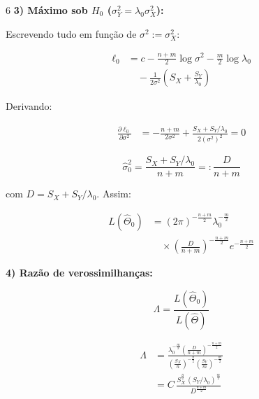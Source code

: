 \documentclass[8pt, a4paper, landscape]{extarticle}
\begin{document}
\begin{multicols}{6}
\textbf{3) Máximo sob $H_0$ ($\sigma_Y^2 = \lambda_0\sigma_X^2$):}

Escrevendo tudo em função de $\sigma^2 := \sigma_X^2$:

\begin{equation*}
\begin{split}
\ell_0 &= c - \frac{n+m}{2}\log\sigma^2 - \frac{m}{2}\log\lambda_0 \\
&\quad - \frac{1}{2\sigma^2}\left(S_X + \frac{S_Y}{\lambda_0}\right)
\end{split}
\end{equation*}

Derivando:

\begin{equation*}
\begin{split}
\frac{\partial\ell_0}{\partial\sigma^2} &= -\frac{n+m}{2\sigma^2} + \frac{S_X + S_Y/\lambda_0}{2(\sigma^2)^2} = 0
\end{split}
\end{equation*}

\begin{equation*}
\hat{\sigma}_0^2 = \frac{S_X + S_Y/\lambda_0}{n+m} =: \frac{D}{n+m}
\end{equation*}

com $D = S_X + S_Y/\lambda_0$. Assim:

\begin{equation*}
\begin{split}
L(\hat{\Theta}_0) &= (2\pi)^{-\frac{n+m}{2}}\lambda_0^{-\frac{m}{2}} \\
&\quad \times \left(\frac{D}{n+m}\right)^{-\frac{n+m}{2}} e^{-\frac{n+m}{2}}
\end{split}
\end{equation*}

\vspace{0.2cm}

\textbf{4) Razão de verossimilhanças:}

\begin{equation*}
\Lambda = \frac{L(\hat{\Theta}_0)}{L(\hat{\Theta})}
\end{equation*}

\begin{equation*}
\begin{split}
\Lambda &= \frac{\lambda_0^{-\frac{m}{2}}\left(\frac{D}{n+m}\right)^{-\frac{n+m}{2}}}{\left(\frac{S_X}{n}\right)^{-\frac{n}{2}}\left(\frac{S_Y}{m}\right)^{-\frac{m}{2}}} \\
&= C\,\frac{S_X^{\frac{n}{2}}\,(S_Y/\lambda_0)^{\frac{m}{2}}}{D^{\frac{n+m}{2}}}
\end{split}
\end{equation*}


\end{multicols}
\end{document}
